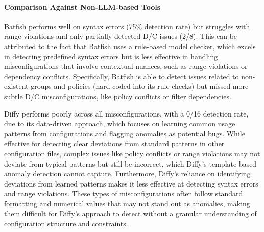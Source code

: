 


\paragraph{Comparison Against Non-LLM-based Tools}
Batfish performs well on syntax errors (75\% detection rate) but struggles
with range violations and only partially detected D/C issues (2/8).
This can be attributed to the fact that Batfish uses a rule-based model checker, which excels in detecting predefined
syntax errors but is less effective in handling misconfigurations that involve contextual nuances, such as range violations or dependency conflicts. Specifically, Batfish is able
to detect issues related to non-existent groups and policies
(hard-coded into its rule checks) but missed more subtle D/C
misconfigurations, like policy conflicts or filter dependencies.

Diffy performs poorly across all misconfigurations, with a 0/16 detection rate, due to its data-driven approach, which focuses on learning common usage patterns from configurations and flagging anomalies as potential bugs. While effective for detecting clear deviations from standard patterns in other configuration files,
complex issues like policy conflicts or range violations may not deviate from typical patterns but still be incorrect, which Diffy’s template-based anomaly detection cannot capture. Furthermore, Diffy's reliance on identifying deviations from learned patterns makes it less effective at detecting syntax errors and range violations. These types of misconfigurations often follow standard formatting and numerical values that may not stand out as anomalies, making them difficult for Diffy's approach to detect without a granular understanding of configuration structure and constraints.

